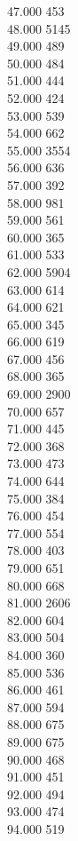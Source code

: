 { 47.000	453 \\
 48.000	5145 \\
 49.000	489 \\
 50.000	484 \\
 51.000	444 \\
 52.000	424 \\
 53.000	539 \\
 54.000	662 \\
 55.000	3554 \\
 56.000	636 \\
 57.000	392 \\
 58.000	981 \\
 59.000	561 \\
 60.000	365 \\
 61.000	533 \\
 62.000	5904 \\
 63.000	614 \\
 64.000	621 \\
 65.000	345 \\
 66.000	619 \\
 67.000	456 \\
 68.000	365 \\
 69.000	2900 \\
 70.000	657 \\
 71.000	445 \\
 72.000	368 \\
 73.000	473 \\
 74.000	644 \\
 75.000	384 \\
 76.000	454 \\
 77.000	554 \\
 78.000	403 \\
 79.000	651 \\
 80.000	668 \\
 81.000	2606 \\
 82.000	604 \\
 83.000	504 \\
 84.000	360 \\
 85.000	536 \\
 86.000	461 \\
 87.000	594 \\
 88.000	675 \\
 89.000	675 \\
 90.000	468 \\
 91.000	451 \\
 92.000	494 \\
 93.000	474 \\
 94.000	519 \\
}
